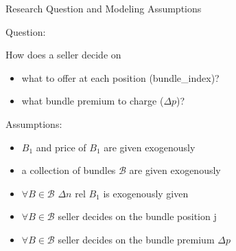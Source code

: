\documentclass[xcolor=dvipsnames,12pt]{beamer}
\theoremstyle{definition}
\begin{document}
\begin{frame}{Research Question and Modeling Assumptions}

Question: 

How does a seller decide on 
\begin{itemize} \item what to offer at each position (bundle\_index)?
 \item what bundle premium to charge ($\Delta p$)?
\end{itemize}
\medskip

Assumptions:
\begin{itemize}
	\item $B_1$ and price of $B_1$ are given exogenously
	\item a collection of bundles $\mathcal{B}$ are given exogenously %
	\item $\forall B \in \mathcal{B}$  $\Delta n $  rel $B_1$ is exogenously given %
	
	\item $\forall B \in \mathcal{B}$ seller decides on the bundle position j %
	\item $\forall B \in \mathcal{B}$ seller decides on the bundle premium $\Delta p$
\end{itemize}
\end{frame}
\end{document}
